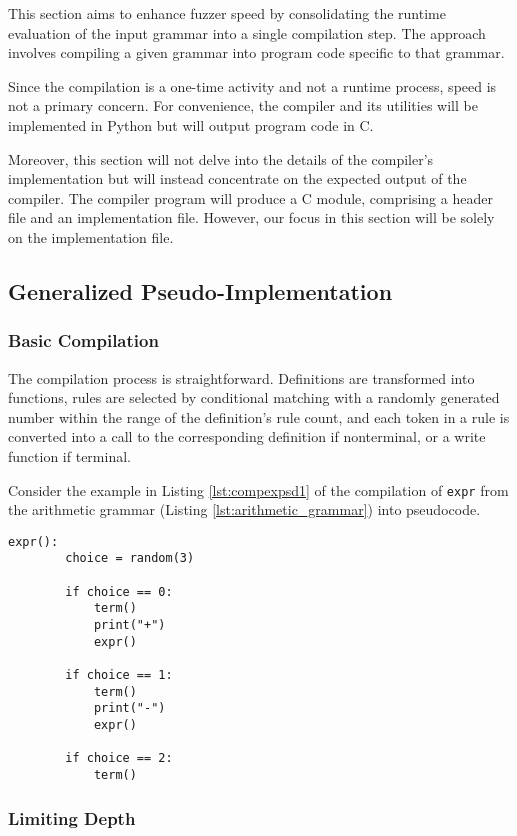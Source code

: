 \documentclass[8pt, twoside]{extarticle}
\begin{document}
This section aims to enhance fuzzer speed by consolidating the runtime evaluation of the input grammar into a single compilation step. The approach involves compiling a given grammar into program code specific to that grammar.

Since the compilation is a one-time activity and not a runtime process, speed is not a primary concern. For convenience, the compiler and its utilities will be implemented in Python but will output program code in C.

Moreover, this section will not delve into the details of the compiler's implementation but will instead concentrate on the expected output of the compiler. The compiler program will produce a C module, comprising a header file and an implementation file. However, our focus in this section will be solely on the implementation file.

\subsection{Generalized Pseudo-Implementation} \label{sec:genpsimp}

\subsubsection{Basic Compilation}

The compilation process is straightforward. Definitions are transformed into functions, rules are selected by conditional matching with a randomly generated number within the range of the definition’s rule count, and each token in a rule is converted into a call to the corresponding definition if nonterminal, or a write function if terminal.

Consider the example in Listing \ref{lst:compexpsd1} of the compilation of \verb|expr| from the arithmetic grammar (Listing \ref{lst:arithmetic_grammar}) into pseudocode.

\begin{lstlisting}[gobble=2, caption={Example compilation (pseudocode)}, label=lst:compexpsd1]
	expr():
		choice = random(3)

		if choice == 0:
			term()
			print("+")
			expr()

		if choice == 1:
			term()
			print("-")
			expr()

		if choice == 2:
			term()
\end{lstlisting}

\subsubsection{Limiting Depth}
\end{document}
